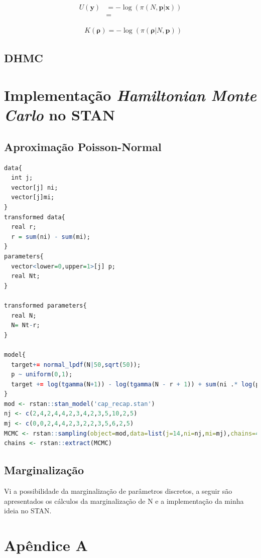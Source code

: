 \documentclass[a4paper,12pt,twoside]{article}
\begin{document}
\begin{align*}
U(\mathbf{y}) &= -\log(\pi(N,\mathbf{p|x}))\\
&=
\end{align*}

\begin{align*}
&K(\bm{\rho}) = -\log(\pi(\bm{\rho}|N,\mathbf{p}))
\end{align*}
\subsection{DHMC}



\newpage
\section{Implementação \textit{Hamiltonian Monte Carlo} no STAN}
\subsection{Aproximação Poisson-Normal}
\begin{lstlisting}[language=R]
data{
  int j;
  vector[j] ni;
  vector[j]mi;
}
transformed data{
  real r;  
  r = sum(ni) - sum(mi);
}
parameters{
  vector<lower=0,upper=1>[j] p;
  real Nt;
}

transformed parameters{
  real N;
  N= Nt-r;
}

model{
  target+= normal_lpdf(N|50,sqrt(50));
  p ~ uniform(0,1);
  target += log(tgamma(N+1)) - log(tgamma(N - r + 1)) + sum(ni .* log(p)  + (N-ni).*log(1-p));
}
mod <- rstan::stan_model('cap_recap.stan')
nj <- c(2,4,2,4,4,2,3,4,2,3,5,10,2,5)
mj <- c(0,0,2,4,4,2,3,2,2,3,5,6,2,5)
MCMC <- rstan::sampling(object=mod,data=list(j=14,ni=nj,mi=mj),chains=4,iter=2000,control=list(max_treedepth=15))
chains <- rstan::extract(MCMC)

\end{lstlisting}


\subsection{Marginalização}
Vi a possibilidade da marginalização de parâmetros discretos, a seguir são apresentados os cálculos da marginalização de N e a implementação da minha ideia no STAN.
\newpage
\section*{Apêndice A}
\end{document}
